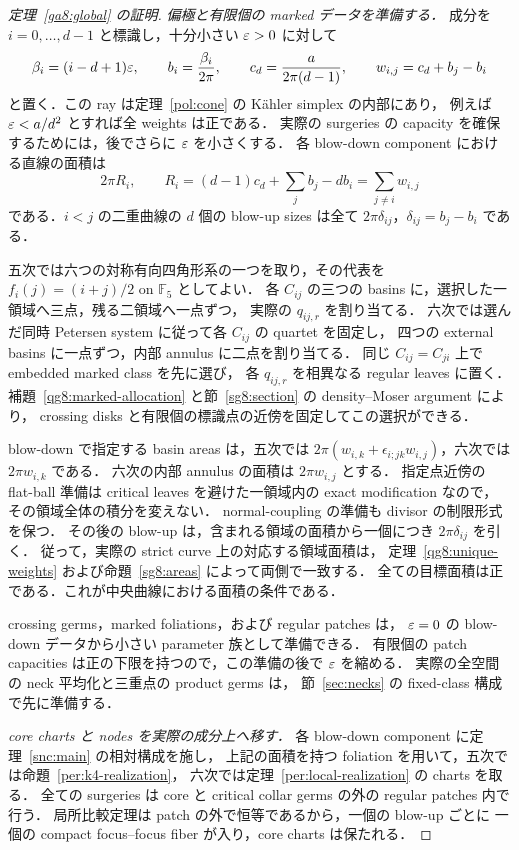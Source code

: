\begin{proof}[定理~\ref{ga8:global} の証明]
\textit{偏極と有限個の marked データを準備する．}
成分を $i=0,\ldots,d-1$ と標識し，十分小さい $\varepsilon>0$ に対して
\[
 \beta_i=(i-d+1)\varepsilon,\qquad
 b_i=\frac{\beta_i}{2\pi},\qquad
 c_d=\frac{a}{2\pi(d-1)},\qquad
 w_{i,j}=c_d+b_j-b_i
\]
と置く．この ray は定理~\ref{pol:cone} の K\"ahler simplex の内部にあり，
例えば $\varepsilon<a/d^2$ とすれば全 weights は正である．
実際の surgeries の capacity を確保するためには，後でさらに $\varepsilon$ を小さくする．
各 blow-down component における直線の面積は
\[
 2\pi R_i,\qquad
 R_i=(d-1)c_d+\sum_jb_j-db_i
     =\sum_{j\ne i}w_{i,j}
\]
である．$i<j$ の二重曲線の $d$ 個の blow-up sizes は全て
$2\pi\delta_{ij}$，$\delta_{ij}=b_j-b_i$ である．

五次では六つの対称有向四角形系の一つを取り，その代表を
$f_i(j)=(i+j)/2$ on $\mathbb F_5$ としてよい．
各 $C_{ij}$ の三つの basins に，選択した一領域へ三点，残る二領域へ一点ずつ，
実際の $q_{ij,r}$ を割り当てる．
六次では選んだ同時 Petersen system に従って各 $C_{ij}$ の quartet を固定し，
四つの external basins に一点ずつ，内部 annulus に二点を割り当てる．
同じ $C_{ij}=C_{ji}$ 上で embedded marked class を先に選び，
各 $q_{ij,r}$ を相異なる regular leaves に置く．
補題~\ref{qg8:marked-allocation} と節~\ref{sg8:section} の density--Moser argument により，
crossing disks と有限個の標識点の近傍を固定してこの選択ができる．

blow-down で指定する basin areas は，五次では
$2\pi(w_{i,k}+\epsilon_{i;jk}w_{i,j})$，六次では $2\pi w_{i,k}$ である．
六次の内部 annulus の面積は $2\pi w_{i,j}$ とする．
指定点近傍の flat-ball 準備は critical leaves を避けた一領域内の exact modification なので，
その領域全体の積分を変えない．
normal-coupling の準備も divisor の制限形式を保つ．
その後の blow-up は，含まれる領域の面積から一個につき $2\pi\delta_{ij}$ を引く．
従って，実際の strict curve 上の対応する領域面積は，
定理~\ref{qg8:unique-weights} および命題~\ref{sg8:areas} によって両側で一致する．
全ての目標面積は正である．これが中央曲線における面積の条件である．

crossing germs，marked foliations，および regular patches は，
$\varepsilon=0$ の blow-down データから小さい parameter 族として準備できる．
有限個の patch capacities は正の下限を持つので，この準備の後で $\varepsilon$ を縮める．
実際の全空間の neck 平均化と三重点の product germs は，
節~\ref{sec:necks} の fixed-class 構成で先に準備する．

\textit{core charts と nodes を実際の成分上へ移す．}
各 blow-down component に定理~\ref{snc:main} の相対構成を施し，
上記の面積を持つ foliation を用いて，五次では命題~\ref{per:k4-realization}，
六次では定理~\ref{per:local-realization} の charts を取る．
全ての surgeries は core と critical collar germs の外の regular patches 内で行う．
局所比較定理は patch の外で恒等であるから，一個の blow-up ごとに
一個の compact focus--focus fiber が入り，core charts は保たれる．


\end{proof}
